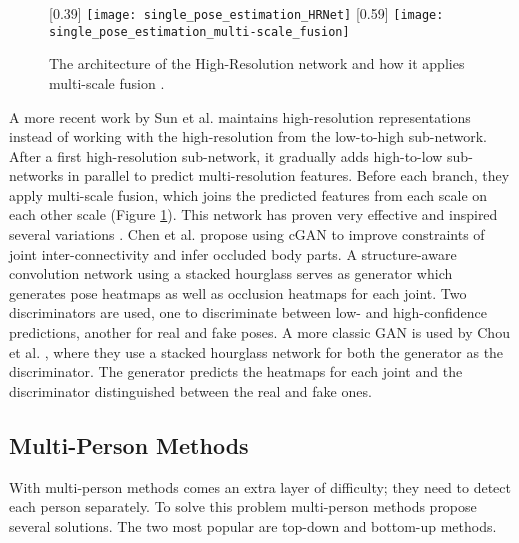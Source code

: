 \begin{figure}[h]
	\centering
	[0.39\textwidth]{%
		\texttt{[image: single\_pose\_estimation\_HRNet]}%
	}
	[0.59\textwidth]{%
		\texttt{[image: single\_pose\_estimation\_multi-scale\_fusion]}%
	}
	\caption{
		The architecture of the High-Resolution network and how it applies multi-scale fusion \cite{Sun2019}.
	}
	\label{fig:HRNet}
\end{figure}

A more recent work by Sun et al. \cite{Sun2019} maintains high-resolution representations instead of working with the high-resolution from the low-to-high sub-network.
After a first high-resolution sub-network, it gradually adds high-to-low sub-networks in parallel to predict multi-resolution features.
Before each branch, they apply multi-scale fusion, which joins the predicted features from each scale on each other scale (Figure \ref{fig:HRNet}).
This network has proven very effective and inspired several variations \cite{Cheng2019, Yu2021, Yuan2021}.
Chen et al. \cite{Chen2017b} propose using \gls{cGAN} \cite{Mirza2014} to improve constraints of joint inter-connectivity and infer occluded body parts.
A structure-aware convolution network using a stacked hourglass serves as generator which generates pose heatmaps as well as occlusion heatmaps for each joint.
Two discriminators are used, one to discriminate between low- and high-confidence predictions, another for real and fake poses.
A more classic GAN is used by Chou et al. \cite{Chou2017}, where they use a stacked hourglass network for both the generator as the discriminator.
The generator predicts the heatmaps for each joint and the discriminator distinguished between the real and fake ones.

\subsection{Multi-Person Methods}
With multi-person methods comes an extra layer of difficulty; they need to detect each person separately.
To solve this problem multi-person methods propose several solutions. 
The two most popular are top-down and bottom-up methods.

